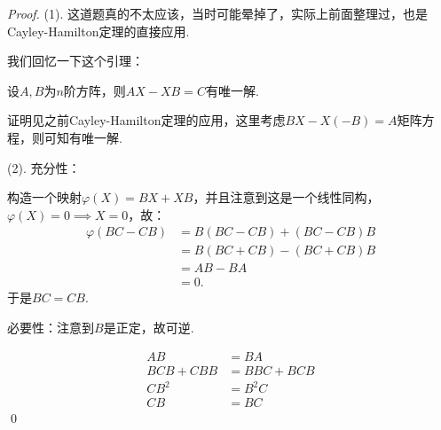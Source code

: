 \begin{proof}
	(1).
	这道题真的不太应该，当时可能晕掉了，实际上前面整理过，也是Cayley-Hamilton定理的直接应用.

	我们回忆一下这个引理：
	\begin{lemma}
		设$A,B$为$n$阶方阵，则$AX-XB=C$有唯一解.
	\end{lemma}
	证明见之前Cayley-Hamilton定理的应用，这里考虑$BX-X(-B)=A$矩阵方程，则可知有唯一解.

	(2). 
	充分性：

	构造一个映射$\varphi(X)=BX+XB$，并且注意到这是一个线性同构，$\varphi(X)=0 \implies X=0$，故：
	\begin{align*}
		\varphi(BC-CB) &= B(BC-CB) + (BC-CB)B \\
		&= B(BC+CB) - (BC+CB)B \\
		&= AB - BA \\
		&= 0.
	\end{align*}
	于是$BC=CB$.

	必要性：注意到$B$是正定，故可逆.

	\begin{align*}
		AB&=BA \\
		BCB + CBB &= BBC + BCB \\	
		CB^2 &= B^2 C\\
		CB&=BC
	\end{align*}
	\qed{}
\end{proof}